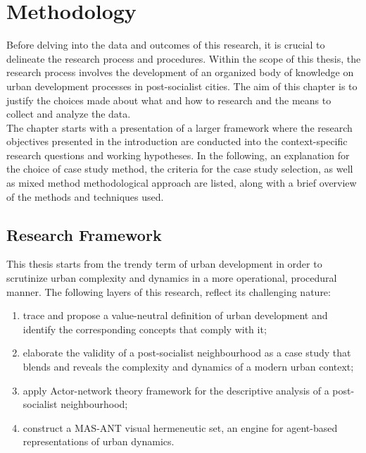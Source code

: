 \documentclass[11pt]{report}
\begin{document}

\chapter{Methodology}

Before delving into the data  and outcomes of this research, it is crucial to delineate the research process and procedures. Within the scope of this thesis, the research process involves the development of an organized body of knowledge on urban development processes in post-socialist cities. The aim of this chapter is to justify the choices made about what and how to research and the means to collect and analyze the data.
\\
The chapter starts with a presentation of a larger framework where the research objectives presented in the introduction are conducted into the context-specific research questions and working hypotheses. In the following, an explanation for the choice of case study method, the criteria for the case study selection, as well as mixed method methodological approach are listed, along with a brief overview of the methods and techniques used.  

\section{Research Framework}

This thesis starts from the trendy term of urban development in order to scrutinize urban complexity and dynamics in a more operational, procedural manner. The following layers of this research, reflect its challenging nature:

\begin{enumerate}
\item trace and propose a value-neutral definition of urban development and identify the corresponding concepts that comply with it;
\item elaborate the validity of a post-socialist neighbourhood as a case study that blends and reveals the complexity and dynamics of a modern urban context;
\item apply Actor-network theory framework for the descriptive analysis of a post-socialist neighbourhood;
\item construct a MAS-ANT visual hermeneutic set, an engine for agent-based representations of urban dynamics.    
\end{enumerate}
\end{document}
